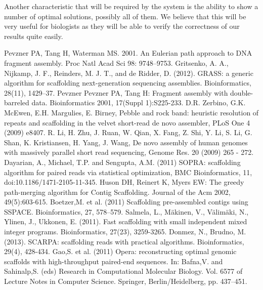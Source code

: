 \documentclass[11pt]{article}
\begin{document}
Another characteristic that will be required by the system is the ability to
show a number of optimal solutions, possibly all of them. We believe that this
will be very useful for biologists as they will be able to verify the
correctness of our results quite easily.

\begin{thebibliography}{widest entry}
   Pevzner PA, Tang H, Waterman MS. 2001. An
    Eulerian path approach to DNA fragment assembly. Proc Natl Acad Sci 98:
    9748–9753.
   Gritsenko, A. A., Nijkamp, J. F., Reinders, M. J. T.,
    and de Ridder, D. (2012). GRASS: a generic algorithm for scaffolding
    next-generation sequencing assemblies.  Bioinformatics, 28(11), 1429–37.
   Pevzner Pevzner PA, Tang H: Fragment assembly with
    double-barreled data. Bioinformatics 2001, 17(Suppl 1):S225-233.
   D.R. Zerbino, G.K. McEwen, E.H. Margulies, E.
    Birney, Pebble and rock band: heuristic resolution of repeats and
    scaffolding in the velvet short-read de novo assembler, PLoS One 4 (2009)
    e8407.
   R. Li, H. Zhu, J. Ruan, W. Qian, X. Fang, Z. Shi, Y. Li,
    S. Li, G.  Shan, K. Kristiansen, H.  Yang, J. Wang, De novo assembly of
    human genomes with massively parallel short read sequencing, Genome Res. 20
    (2009) 265 - 272.
   Dayarian, A., Michael, T.P. and Sengupta, A.M. (2011) SOPRA:
    scaffolding algorithm for paired reads via statistical optimization, BMC
    Bioinformatics, 11, doi:10.1186/1471-2105-11-345.
   Huson DH, Reinert K, Myers EW: The greedy
    path-merging algorithm for Contig Scaffolding. Journal of the Acm 2002,
    49(5):603-615.
   Boetzer,M. et al. (2011) Scaffolding pre-assembled contigs
    using SSPACE.  Bioinformatics, 27, 578–579.
   Salmela, L., Mäkinen, V., Välimäki, N., Ylinen, J., Ukkonen,
    E. (2011). Fast scaffolding with small independent mixed integer programs.
    Bioinformatics, 27(23), 3259-3265.
   Donmez, N., Brudno, M. (2013). SCARPA: scaffolding reads
    with practical algorithms. Bioinformatics, 29(4), 428-434.
   Gao,S. et al. (2011) Opera: reconstructing optimal genomic
    scaffolds with high-throughput paired-end sequences. In: Bafna,V. and
    Sahinalp,S. (eds) Research in Computational Molecular Biology. Vol. 6577 of
    Lecture Notes in Computer Science. Springer, Berlin/Heidelberg, pp. 437–451.

\end{thebibliography}
\end{document}
